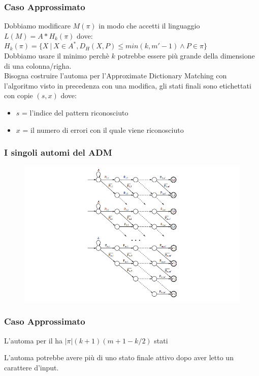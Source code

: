 \documentclass{beamer}
\begin{document}
\begin{frame}
\frametitle{Caso Approssimato}
Dobbiamo modificare $M(\pi)$ in modo che accetti il linguaggio $L(M) = A * H_k(\pi)$ dove: $H_k(\pi) = \{X\ |\ X \in A^*, D_H(X,P) \leq min(k,m'-1) \wedge P\in \pi \}$\\
Dobbiamo usare il minimo perchè $k$ potrebbe essere più grande della dimensione di una colonna/righa.\\
Bisogna costruire l'automa per l'Approximate Dictionary Matching con l'algoritmo visto in precedenza con una modifica, gli stati finali sono etichettati con copie $(s,x)$ dove:
\begin{itemize}
\item $s$ = l'indice del pattern riconosciuto
\item $x$ = il numero di errori con il quale viene riconosciuto
\end{itemize}
\end{frame}

\begin{frame}
\frametitle{I singoli automi del ADM}
\begin{figure}[p]
    \includegraphics[width=1\textwidth]{ADM.png}
\end{figure}

\end{frame}

\begin{frame}
\frametitle{Caso Approssimato}
  \begin{theorem}[]
  L'automa per il ha $|\pi|(k+1)(m+1 - k/2)$ stati
  \end{theorem}
\begin{theorem}[]
L'automa potrebbe avere più di uno stato finale attivo dopo aver letto un carattere d'input.
\end{theorem}
\end{frame}
\end{document}
